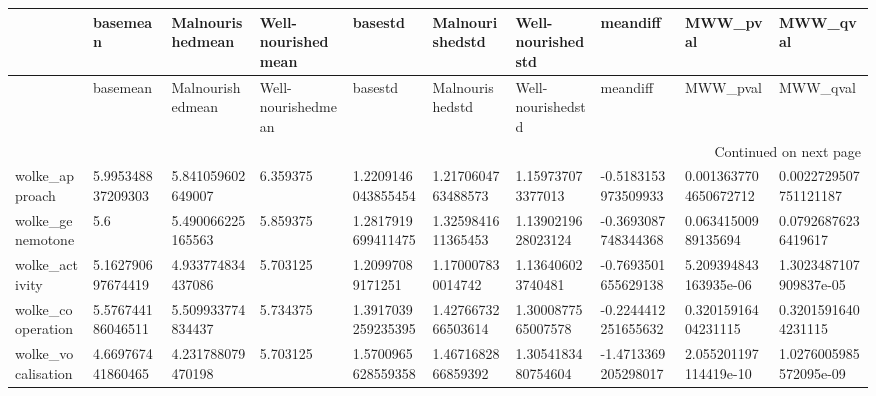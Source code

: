 \begin{longtable}{llllllllll}
\toprule
{} &           basemean &   Malnourishedmean & Well-nourishedmean &             basestd &     Malnourishedstd &   Well-nourishedstd &             meandiff &               MWW\_pval &                MWW\_qval \\
\midrule
\endfirsthead

\toprule
{} &           basemean &   Malnourishedmean & Well-nourishedmean &             basestd &     Malnourishedstd &   Well-nourishedstd &             meandiff &               MWW\_pval &                MWW\_qval \\
\midrule
\endhead
\midrule
\multicolumn{10}{r}{{Continued on next page}} \\
\midrule
\endfoot

\bottomrule
\endlastfoot
wolke\_approach     &  5.995348837209303 &  5.841059602649007 &           6.359375 &  1.2209146043855454 &  1.2170604763488573 &   1.159737073377013 &  -0.5183153973509933 &  0.0013637704650672712 &   0.0022729507751121187 \\
wolke\_genemotone   &                5.6 &  5.490066225165563 &           5.859375 &  1.2817919699411475 &  1.3259841611365453 &  1.1390219628023124 &  -0.3693087748344368 &    0.06341500989135694 &     0.07926876236419617 \\
wolke\_activity     &  5.162790697674419 &  4.933774834437086 &           5.703125 &    1.20997089171251 &   1.170007830014742 &   1.136406023740481 &  -0.7693501655629138 &  5.209394843163935e-06 &  1.3023487107909837e-05 \\
wolke\_cooperation  &  5.576744186046511 &  5.509933774834437 &           5.734375 &  1.3917039259235395 &  1.4276673266503614 &  1.3000877565007578 &  -0.2244412251655632 &    0.32015916404231115 &     0.32015916404231115 \\
wolke\_vocalisation &  4.669767441860465 &  4.231788079470198 &           5.703125 &  1.5700965628559358 &  1.4671682866859392 &  1.3054183480754604 &  -1.4713369205298017 &  2.055201197114419e-10 &  1.0276005985572095e-09 \\
\end{longtable}
